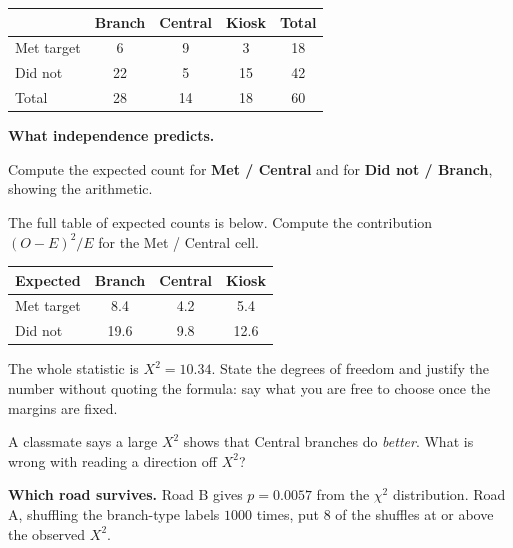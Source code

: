 \documentclass[11pt]{article}
\newcommand{\answerspace}[1]{\vspace{#1}}
\begin{document}
\begin{center}
\renewcommand{\arraystretch}{1.2}
\begin{tabular}{lcccc}
\toprule
 & \textbf{Branch} & \textbf{Central} & \textbf{Kiosk} & \textbf{Total} \\
\midrule
Met target & 6 & 9 & 3 & 18 \\
Did not & 22 & 5 & 15 & 42 \\
\midrule
Total & 28 & 14 & 18 & 60 \\
\bottomrule
\end{tabular}
\end{center}

\begin{questions}

\item \textbf{What independence predicts.}

\begin{parts}
\item Compute the expected count for \textbf{Met / Central} and for \textbf{Did not / Branch},
showing the arithmetic.
\answerspace{4em}

\item The full table of expected counts is below. Compute the contribution
$(O-E)^2/E$ for the Met / Central cell.

\begin{center}
\renewcommand{\arraystretch}{1.2}
\begin{tabular}{lccc}
\toprule
\textbf{Expected} & \textbf{Branch} & \textbf{Central} & \textbf{Kiosk} \\
\midrule
Met target & 8.4 & 4.2 & 5.4 \\
Did not & 19.6 & 9.8 & 12.6 \\
\bottomrule
\end{tabular}
\end{center}
\answerspace{3.5em}

\item The whole statistic is $X^2 = 10.34$. State the degrees of freedom and justify the number
without quoting the formula: say what you are free to choose once the margins are fixed.
\answerspace{4em}

\item A classmate says a large $X^2$ shows that Central branches do \emph{better}. What is wrong
with reading a direction off $X^2$?
\answerspace{3.5em}
\end{parts}

\item \textbf{Which road survives.} Road B gives $p = 0.0057$ from the $\chi^2$ distribution.
Road A, shuffling the branch-type labels $1000$ times, put $8$ of the shuffles at or above the
observed $X^2$.


\end{questions}
\end{document}
